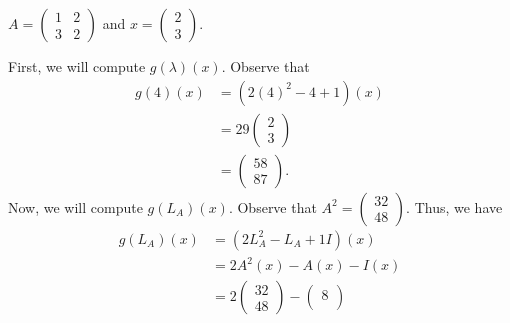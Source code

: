 \begin{enumerate}
\begin{solution}
              \begin{center}
                  \( A = \begin{pmatrix} 
                      1 & 2 \\
                      3 & 2 
                            \end{pmatrix}  \) and \( x = \begin{pmatrix} 
                                       2 \\
                                       3
                                      \end{pmatrix} \).
              \end{center}
              First, we will compute \( g(\lambda)(x) \). Observe that
              \begin{align*}
                  g(4)(x) &= (2 (4)^{2} - 4 + 1  )(x) \\
                          &= 29 \begin{pmatrix} 
                                     2 \\
                                     3 
                                    \end{pmatrix} \\
                          &= \begin{pmatrix} 
                                     58 \\
                                     87
                                    \end{pmatrix}.
              \end{align*}
            Now, we will compute \( g({L}_{A})(x)  \). Observe that \( A^{2} = \begin{pmatrix} 
                       32 \\
                       48
                      \end{pmatrix}  \). Thus, we have
            \begin{align*}
                g({L}_{A})(x) &= (2 {L}_{A}^{2} - {L}_{A} + 1 I)(x)  \\
                        &= 2 A^{2}(x) - A(x) - I(x) \\
                        &= 2 \begin{pmatrix} 
                                   32 \\
                                   48
                                  \end{pmatrix} - \begin{pmatrix} 
                                             8 \\

\end{pmatrix}
\end{align*}
\end{solution}
\end{enumerate}
